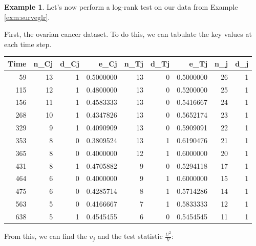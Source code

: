 \documentclass[
  openany]{book}
\newenvironment{Shaded}{\begin{snugshade}}{\end{snugshade}}
\newcommand{\CommentTok}[1]{\textcolor[rgb]{0.56,0.35,0.01}{\textit{#1}}}
\newcommand{\ControlFlowTok}[1]{\textcolor[rgb]{0.13,0.29,0.53}{\textbf{#1}}}
\newcommand{\DecValTok}[1]{\textcolor[rgb]{0.00,0.00,0.81}{#1}}
\newcommand{\FunctionTok}[1]{\textcolor[rgb]{0.13,0.29,0.53}{\textbf{#1}}}
\newcommand{\NormalTok}[1]{#1}
\newcommand{\OtherTok}[1]{\textcolor[rgb]{0.56,0.35,0.01}{#1}}
\newcommand{\SpecialCharTok}[1]{\textcolor[rgb]{0.81,0.36,0.00}{\textbf{#1}}}
\theoremstyle{definition}
\theoremstyle{definition}
\newtheorem{example}{Example}[chapter]
\theoremstyle{definition}
\theoremstyle{definition}
\theoremstyle{remark}
\begin{document}
\begin{example}
Let's now perform a log-rank test on our data from Example \ref{exm:surveglr}.

First, the ovarian cancer dataset. To do this, we can tabulate the key values at each time step.

\begin{table}
\centering
\begin{tabular}{r|r|r|r|r|r|r|r|r}
\hline
Time & n\_Cj & d\_Cj & e\_Cj & n\_Tj & d\_Tj & e\_Tj & n\_j & d\_j\\
\hline
59 & 13 & 1 & 0.5000000 & 13 & 0 & 0.5000000 & 26 & 1\\
\hline
115 & 12 & 1 & 0.4800000 & 13 & 0 & 0.5200000 & 25 & 1\\
\hline
156 & 11 & 1 & 0.4583333 & 13 & 0 & 0.5416667 & 24 & 1\\
\hline
268 & 10 & 1 & 0.4347826 & 13 & 0 & 0.5652174 & 23 & 1\\
\hline
329 & 9 & 1 & 0.4090909 & 13 & 0 & 0.5909091 & 22 & 1\\
\hline
353 & 8 & 0 & 0.3809524 & 13 & 1 & 0.6190476 & 21 & 1\\
\hline
365 & 8 & 0 & 0.4000000 & 12 & 1 & 0.6000000 & 20 & 1\\
\hline
431 & 8 & 1 & 0.4705882 & 9 & 0 & 0.5294118 & 17 & 1\\
\hline
464 & 6 & 0 & 0.4000000 & 9 & 1 & 0.6000000 & 15 & 1\\
\hline
475 & 6 & 0 & 0.4285714 & 8 & 1 & 0.5714286 & 14 & 1\\
\hline
563 & 5 & 0 & 0.4166667 & 7 & 1 & 0.5833333 & 12 & 1\\
\hline
638 & 5 & 1 & 0.4545455 & 6 & 0 & 0.5454545 & 11 & 1\\
\hline
\end{tabular}
\end{table}

From this, we can find the \(v_{j}\) and the test statistic \(\frac{U^2}{V}\):

\begin{Shaded}
\end{Shaded}
\end{example}
\end{document}
